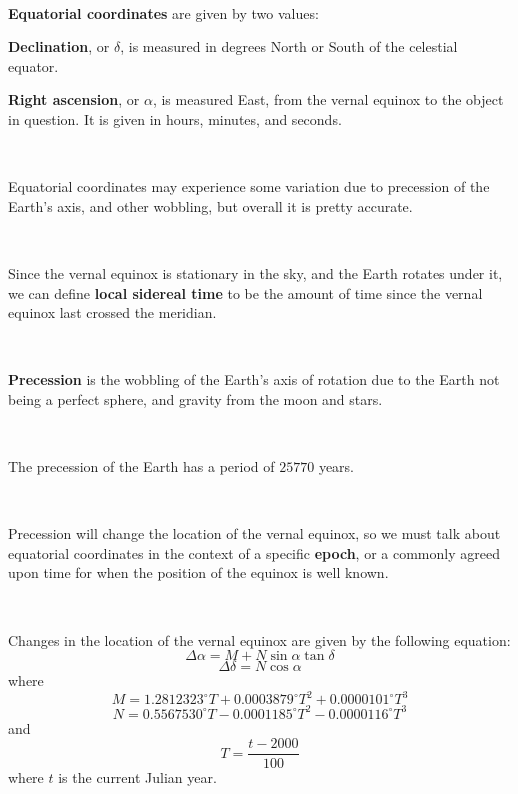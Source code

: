 \documentclass{article}
\begin{document}
\begin{definition}
\

\textbf{Equatorial coordinates} are given by two values:

\textbf{Declination}, or $\delta$, is measured in degrees North or South of the celestial equator.

\textbf{Right ascension}, or $\alpha$, is measured East, from the vernal equinox to the object in question. It is given in hours, minutes, and seconds.
\end{definition}

\begin{remark}
\

Equatorial coordinates may experience some variation due to precession of the Earth's axis, and other wobbling, but overall it is pretty accurate.
\end{remark}

\begin{definition}
\

Since the vernal equinox is stationary in the sky, and the Earth rotates under it, we can define \textbf{local sidereal time} to be the amount of time since the vernal equinox last crossed the meridian.
\end{definition}

\begin{definition}[Precession]
\

\textbf{Precession} is the wobbling of the Earth's axis of rotation due to the Earth not being a perfect sphere, and gravity from the moon and stars. 
\end{definition}

\begin{example}
\

The precession of the Earth has a period of $25770$ years.
\end{example}

\begin{definition}[Epochs]
\

Precession will change the location of the vernal equinox, so we must talk about equatorial coordinates in the context of a specific \textbf{epoch}, or a commonly agreed upon time for when the position of the equinox is well known. 
\end{definition}

\begin{proposition}
\

Changes in the location of the vernal equinox are given by the following equation: $$\Delta \alpha = M + N\sin\alpha\tan\delta$$$$\Delta \delta = N \cos \alpha$$where $$M = 1.2812323^\circ T + 0.0003879^\circ T^2 + 0.0000101^\circ T^3$$$$N = 0.5567530^\circ T - 0.0001185^\circ T^2 - 0.0000116^\circ T^3$$and$$T = \frac{t-2000}{100}$$where $t$ is the current Julian year.
\end{proposition}
\end{document}
